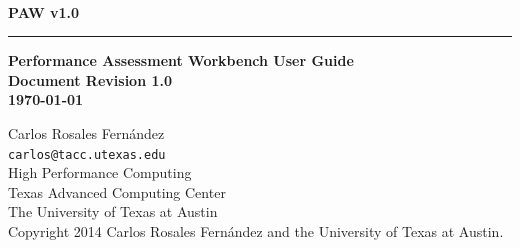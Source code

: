 \documentclass[10pt,a4paper]{report}
\begin{document}
\begin{titlepage}
\thispagestyle{empty}	%
\verb+ +
\vspace{1em}
\begin{flushright}
\huge\bf PAW v1.0\\
\rule{\textwidth}{4pt}
\large{\bf Performance Assessment Workbench User Guide\\
Document Revision 1.0\\
\today}
\end{flushright}

\newpage
\thispagestyle{empty}
\begin{flushleft}
Carlos Rosales Fern\'andez\\
\verb+carlos@tacc.utexas.edu+\\
\vspace{0.5em}
High Performance Computing \\
Texas Advanced Computing Center\\
The University of Texas at Austin\\
\vspace{1cm}
Copyright 2014 Carlos Rosales Fern\'andez and the University of Texas at Austin.
\end{flushleft}
\newpage
\end{titlepage}
\end{document}
